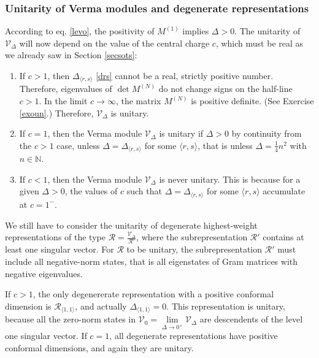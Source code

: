 \documentclass[12pt, a4paper, notitlepage, twoside]{report}
\numberwithin{equation}{section}
\theoremstyle{break}
\begin{document}
\subsubsection{Unitarity of Verma modules and degenerate representations}

According to eq. \eqref{levo}, the positivity of $M^{(1)}$ implies $\Delta >0$. 
The unitarity of $\mathcal{V}_\Delta$ will now depend on the value of the central charge $c$, which must be real 
as we already saw in Section \ref{secsots}:
\begin{enumerate}
 \item 
If $c > 1$, then $\Delta_{\langle r,s \rangle}$ \eqref{drs} cannot be a real, strictly positive number. 
Therefore, eigenvalues of $\det M^{(N)}$ do not change signs on the half-line $c > 1$.
In the limit $c \to \infty$, the matrix $M^{(N)}$ is positive definite. (See Exercise \ref{exoun}.) 
Therefore, $\mathcal{V}_\Delta$ is unitary. 
\item 
If $c=1$, then the Verma module $\mathcal{V}_\Delta$ is unitary if $\Delta > 0$ by continuity from the $c>1$ case, unless $\Delta=\Delta_{\langle r,s \rangle}$ for some $\langle r,s \rangle$, that is unless $\Delta =\frac14 n^2$ with $n\in {\mathbb{N}}$.
\item 
If $c<1$, then the Verma module $\mathcal{V}_\Delta$ is never unitary. 
This is because for a given $\Delta>0$, the values of $c$ such that $\Delta = \Delta_{\langle r,s \rangle}$ for some $\langle r,s \rangle$ accumulate at $c=1^-$.
\end{enumerate}

We still have to consider the unitarity of degenerate highest-weight representations of the type $\mathcal{R}=\frac{\mathcal{V}_\Delta}{\mathcal{R}'}$, where the subrepresentation $\mathcal{R}'$ contains at least one singular vector. 
For $\mathcal{R}$ to be unitary, the subrepresentation $\mathcal{R}'$ must include all negative-norm states, that is all eigenstates of Gram matrices with negative eigenvalues.

If $c > 1$, the only degenererate representation with a positive conformal dimension is $\mathcal{R}_{\langle 1,1 \rangle}$, and actually $\Delta_{\langle 1,1 \rangle}=0$. This representation is unitary, because all the zero-norm states in $\mathcal{V}_0 = \underset{\Delta \to 0^+}{\lim} \mathcal{V}_\Delta$ are descendents of the level one singular vector. If $c=1$, all degenerate representations have positive conformal dimensions, and again they are unitary.
\end{document}
